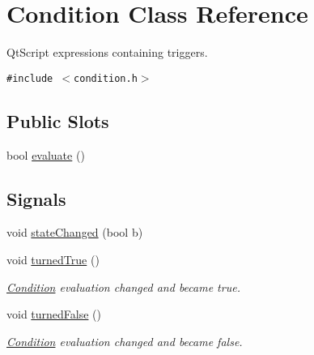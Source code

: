 \hypertarget{class_condition}{
\section{Condition Class Reference}
\label{class_condition}
}
QtScript expressions containing triggers.  


{\tt \#include $<$condition.h$>$}

\subsection*{Public Slots}
\begin{CompactItemize}
\item 
bool \hyperlink{class_condition_1ed8dccd3394ae01378788f66f072f8f}{evaluate} ()
\end{CompactItemize}
\subsection*{Signals}
\begin{CompactItemize}
\item 
void \hyperlink{class_condition_edef85651f9da74dc23c179a2bebcae9}{stateChanged} (bool b)
\item 
\hypertarget{class_condition_14c04260861f65c3e6e86d15a54627a3}{
void \hyperlink{class_condition_14c04260861f65c3e6e86d15a54627a3}{turnedTrue} ()}
\label{class_condition_14c04260861f65c3e6e86d15a54627a3}

\begin{CompactList}\small\item\em \hyperlink{class_condition}{Condition} evaluation changed and became true. \item\end{CompactList}\item 
\hypertarget{class_condition_dd46bba9525b877221a90b13238f6c8a}{
void \hyperlink{class_condition_dd46bba9525b877221a90b13238f6c8a}{turnedFalse} ()}
\label{class_condition_dd46bba9525b877221a90b13238f6c8a}

\begin{CompactList}\small\item\em \hyperlink{class_condition}{Condition} evaluation changed and became false. \item\end{CompactList}\end{CompactItemize}
